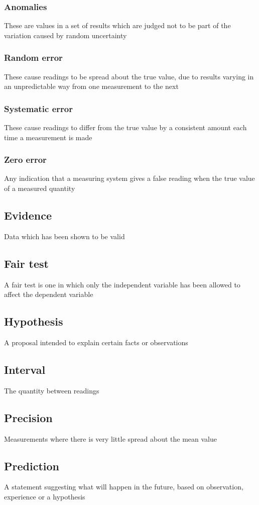 \documentclass{article}[18pt]
\begin{document}
\subsubsection{Anomalies}
These are values in a set of results which are judged not to be part of the variation caused by random uncertainty
\subsubsection{Random error}
These cause readings to be spread about the true value, due to results varying in an unpredictable way from one measurement to the next
\subsubsection{Systematic error}
These cause readings to differ from the true value by a consistent amount each time a measurement is made
\subsubsection{Zero error}
Any indication that a measuring system gives a false reading when the true value of a measured quantity
\subsection{Evidence}
Data which has been shown to be valid
\subsection{Fair test}
A fair test is one in which only the independent variable has been allowed to affect the dependent variable
\subsection{Hypothesis}
A proposal intended to explain certain facts or observations
\subsection{Interval}
The quantity between readings
\subsection{Precision}
Measurements where there is very little spread about the mean value
\subsection{Prediction}
A statement suggesting what will happen in the future, based on observation, experience or a hypothesis
\end{document}
